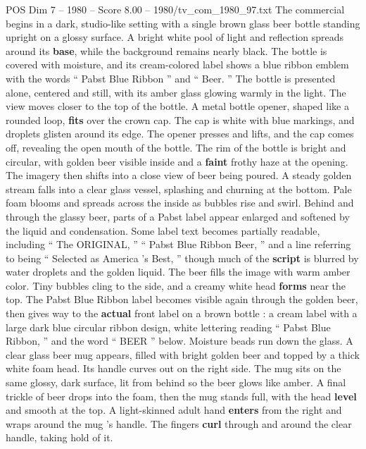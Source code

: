 \begin{textsample}{POS Dim 7 – 1980 – Score 8.00 – 1980/tv\_com\_1980\_97.txt}  \label{ex:f7_pos_042}
The commercial begins in a dark, studio-like setting with a single brown glass beer bottle standing upright on a glossy surface.
A bright white pool of light and reflection spreads around its \textbf{base}, while the background remains nearly black.
The bottle is covered with moisture, and its cream-colored label shows a blue ribbon emblem with the words “ Pabst Blue Ribbon ” and “ Beer. ” The bottle is presented alone, centered and still, with its amber glass glowing warmly in the light.
The view moves closer to the top of the bottle.
A metal bottle opener, shaped like a rounded loop, \textbf{fits} over the crown cap.
The cap is white with blue markings, and droplets glisten around its edge.
The opener presses and lifts, and the cap comes off, revealing the open mouth of the bottle.
The rim of the bottle is bright and circular, with golden beer visible inside and a \textbf{faint} frothy haze at the opening.
The imagery then shifts into a close view of beer being poured.
A steady golden stream falls into a clear glass vessel, splashing and churning at the bottom.
Pale foam blooms and spreads across the inside as bubbles rise and swirl.
Behind and through the glassy beer, parts of a Pabst label appear enlarged and softened by the liquid and condensation.
Some label text becomes partially readable, including “ The ORIGINAL, ” “ Pabst Blue Ribbon Beer, ” and a line referring to being “ Selected as America ’s Best, ” though much of the \textbf{script} is blurred by water droplets and the golden liquid.
The beer fills the image with warm amber color.
Tiny bubbles cling to the side, and a creamy white head \textbf{forms} near the top.
The Pabst Blue Ribbon label becomes visible again through the golden beer, then gives way to the \textbf{actual} front label on a brown bottle : a cream label with a large dark blue circular ribbon design, white lettering reading “ Pabst Blue Ribbon, ” and the word “ BEER ” below.
Moisture beads run down the glass.
A clear glass beer mug appears, filled with bright golden beer and topped by a thick white foam head.
Its handle curves out on the right side.
The mug sits on the same glossy, dark surface, lit from behind so the beer glows like amber.
A final trickle of beer drops into the foam, then the mug stands full, with the head \textbf{level} and smooth at the top.
A light-skinned adult hand \textbf{enters} from the right and wraps around the mug ’s handle.
The fingers \textbf{curl} through and around the clear handle, taking hold of it.

\end{textsample}
